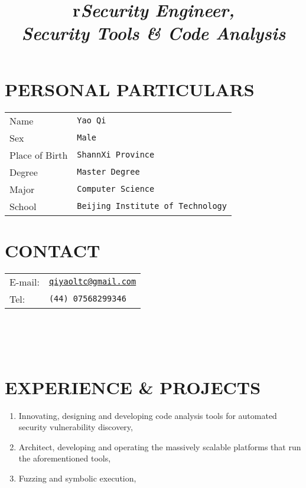 \begin{resume}

\section{\textsc{PERSONAL PARTICULARS}}
\begin{tabular}{l l}
Name & \texttt{Yao Qi} \\
Sex & \texttt{Male} \\
Place of Birth & \texttt{ShannXi Province} \\
Degree & \texttt{Master Degree} \\
Major & \texttt{Computer Science} \\
School & \texttt{Beijing Institute of Technology} \\
\end{tabular}
\section{\textsc{CONTACT}}
\begin{tabular}{l l}
E-mail: & \href{qiyaoltc@gmail.com}{\texttt{qiyaoltc@gmail.com}} \\
Tel: & \texttt{(44) 07568299346} \\
\end{tabular}

\begin{format}
  \title{r}\\
  \\
  \body\\
\end{format}

\section{\textsc{EXPERIENCE \& PROJECTS}}
\title{\emph{Security Engineer, \\ Security Tools \& Code Analysis}}
\begin{position}
  \begin{enumerate}
  \item[] Innovating, designing and developing code analysis tools for automated security vulnerability discovery,
  \item[] Architect, developing and operating the massively scalable platforms that run the aforementioned tools,
  \item[] Fuzzing and symbolic execution,
  \end{enumerate}
\end{position}



\end{resume}
